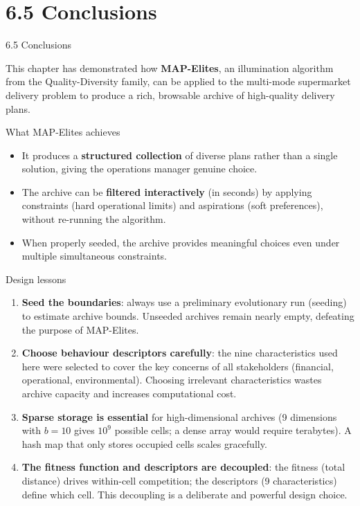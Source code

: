 \documentclass[aspectratio=169,10pt]{beamer}
\begin{document}
\section{6.5 Conclusions}

\begin{frame}[allowframebreaks]{6.5 Conclusions}

This chapter has demonstrated how \textbf{MAP-Elites}, an illumination
algorithm from the Quality-Diversity family, can be applied to the
multi-mode supermarket delivery problem to produce a rich, browsable
archive of high-quality delivery plans.

\medskip
\begin{block}{What MAP-Elites achieves}
\begin{itemize}
  \item It produces a \textbf{structured collection} of diverse plans
        rather than a single solution, giving the operations manager
        genuine choice.
  \item The archive can be \textbf{filtered interactively} (in seconds)
        by applying constraints (hard operational limits) and aspirations
        (soft preferences), without re-running the algorithm.
  \item When properly seeded, the archive provides meaningful choices
        even under multiple simultaneous constraints.
\end{itemize}
\end{block}

\medskip
\begin{block}{Design lessons}
\begin{enumerate}
  \item \textbf{Seed the boundaries}: always use a preliminary
        evolutionary run (seeding) to estimate archive bounds.
        Unseeded archives remain nearly empty, defeating the purpose
        of MAP-Elites.
  \item \textbf{Choose behaviour descriptors carefully}: the nine
        characteristics used here were selected to cover the key
        concerns of all stakeholders (financial, operational,
        environmental).
        Choosing irrelevant characteristics wastes archive capacity
        and increases computational cost.
  \item \textbf{Sparse storage is essential} for high-dimensional
        archives (9 dimensions with $b=10$ gives $10^9$ possible
        cells; a dense array would require terabytes).
        A hash map that only stores occupied cells scales gracefully.
  \item \textbf{The fitness function and descriptors are decoupled}:
        the fitness (total distance) drives within-cell competition;
        the descriptors (9 characteristics) define which cell.
        This decoupling is a deliberate and powerful design choice.
\end{enumerate}
\end{block}


\end{frame}
\end{document}
